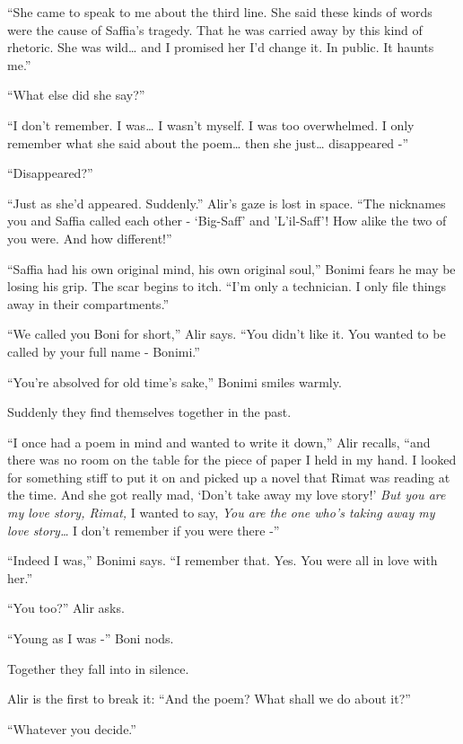 \documentclass[twoside,11pt]{book}
\begin{document}
``She came to speak to me about the third line. She said these kinds of words were the cause of Saffia's
tragedy. That he was carried away by this kind of rhetoric. She was wild{\dots} and I promised her I'd
change it. In public. It haunts me.''

``What else did she say?''

``I don't remember. I was{\dots} I wasn't myself. I was too overwhelmed. I only remember what she said
about the poem{\dots} then she just{\dots} disappeared -''

``Disappeared?''

``Just as she'd appeared. Suddenly.'' Alir's gaze is lost in space. ``The
nicknames you and Saffia called each other - `Big-Saff' and 'L'il-Saff'! How alike the two of you were. And how
different!''

``Saffia had his own original mind, his own original soul,'' Bonimi fears he may be losing his
grip. The scar begins to itch. ``I'm only a technician. I only file things away in their
compartments.''

``We called you Boni for short,'' Alir says. ``You didn't like it. You wanted to
be called by your full name - Bonimi.''

``You're absolved for old time's sake,'' Bonimi smiles warmly.

Suddenly they find themselves together in the past.

``I once had a poem in mind and wanted to write it down,'' Alir recalls, ``and
there was no room on the table for the piece of paper I held in my hand.  I looked for something stiff to put it on and
picked up a novel that Rimat was reading at the time. And she got really mad, `Don't take away my love story!'
\textit{But you are my love story, Rimat,} I wanted to say, \textit{You are the one who's taking away my love
story{\dots}} I don't remember if you were there -''

``Indeed I was,'' Bonimi says. ``I remember that. Yes. You were all in love with
her.''

``You too?'' Alir asks.

``Young as I was -'' Boni nods.

Together they fall into in silence.

Alir is the first to break it: ``And the poem? What shall we do about it?''

``Whatever you decide.''


\bigskip

\chapter{}
\end{document}
